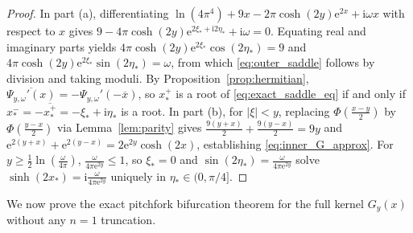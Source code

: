\documentclass[11pt,a4paper,reqno]{amsart}
\theoremstyle{definition}
\theoremstyle{remark}
\numberwithin{equation}{section}
\newcommand{\ii}{\mathrm{i}}
\newcommand{\ee}{\mathrm{e}}
\begin{document}
\begin{proof}
In part (a), differentiating $\ln(4\pi^4) + 9x - 2\pi\cosh(2y)\ee^{2x} + \ii\omega x$ with respect to $x$ gives $9 - 4\pi\cosh(2y)\ee^{2\xi_*+\ii 2\eta_*} + \ii\omega = 0$. Equating real and imaginary parts yields $4\pi\cosh(2y)\ee^{2\xi_*}\cos(2\eta_*) = 9$ and $4\pi\cosh(2y)\ee^{2\xi_*}\sin(2\eta_*) = \omega$, from which \eqref{eq:outer_saddle} follows by division and taking moduli. By Proposition~\ref{prop:hermitian}, $\overline{\Psi_{y,\omega}'(x)} = -\Psi_{y,\omega}'(-\overline{x})$, so $x_*^+$ is a root of \eqref{eq:exact_saddle_eq} if and only if $x_*^- = -\overline{x_*^+} = -\xi_* + \ii\eta_*$ is a root. In part (b), for $|\xi| < y$, replacing $\Phi(\frac{x-y}{2})$ by $\Phi(\frac{y-x}{2})$ via Lemma~\ref{lem:parity} gives $\frac{9(y+x)}{2} + \frac{9(y-x)}{2} = 9y$ and $\ee^{2(y+x)} + \ee^{2(y-x)} = 2\ee^{2y}\cosh(2x)$, establishing \eqref{eq:inner_G_approx}. For $y \ge \frac{1}{2}\ln(\frac{\omega}{4\pi})$, $\frac{\omega}{4\pi\ee^{2y}} \le 1$, so $\xi_* = 0$ and $\sin(2\eta_*) = \frac{\omega}{4\pi\ee^{2y}}$ solve $\sinh(2x_*) = \ii\frac{\omega}{4\pi\ee^{2y}}$ uniquely in $\eta_* \in (0,\pi/4]$.
\end{proof}

We now prove the exact pitchfork bifurcation theorem for the full kernel $G_y(x)$ without any $n=1$ truncation.
\end{document}
